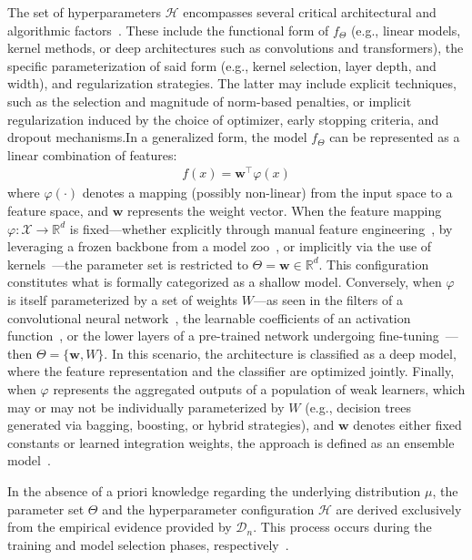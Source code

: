 The set of hyperparameters $\mathcal{H}$ encompasses several critical architectural and algorithmic factors~\citep{shalev2014understanding,goodfellow2016deep,aggarwal2023neural}. These include the functional form of $f_\Theta$ (e.g., linear models, kernel methods, or deep architectures such as convolutions and transformers), the specific parameterization of said form (e.g., kernel selection, layer depth, and width), and regularization strategies. 
The latter may include explicit techniques, such as the selection and magnitude of norm-based penalties, or implicit regularization induced by the choice of optimizer, early stopping criteria, and dropout mechanisms.In a generalized form, the model $f_\Theta$ can be represented as a linear combination of features:\begin{align}\label{ch2:eq:function}f(x) = \mathbf{w}^\top \varphi(x)\end{align}where $\varphi(\cdot)$ denotes a mapping (possibly non-linear) from the input space to a feature space, and $\mathbf{w}$ represents the weight vector.
%
When the feature mapping $\varphi: \mathcal{X} \rightarrow \mathbb{R}^d$ is fixed—whether explicitly through manual feature engineering~\citep{duboue2020art}, by leveraging a frozen backbone from a model zoo~\citep{shu2021zoo}, or implicitly via the use of kernels~\citep{shalev2014understanding}—the parameter set is restricted to $\Theta = \mathbf{w} \in \mathbb{R}^d$. 
This configuration constitutes what is formally categorized as a shallow model.
Conversely, when $\varphi$ is itself parameterized by a set of weights $W$—as seen in the filters of a convolutional neural network~\citep{goodfellow2016deep}, the learnable coefficients of an activation function~\citep{apicella2021survey}, or the lower layers of a pre-trained network undergoing fine-tuning~\citep{shu2021zoo}—then $\Theta = \{ \mathbf{w}, W \}$. 
In this scenario, the architecture is classified as a deep model, where the feature representation and the classifier are optimized jointly.
Finally, when $\varphi$ represents the aggregated outputs of a population of weak learners, which may or may not be individually parameterized by $W$ (e.g., decision trees generated via bagging, boosting, or hybrid strategies), and $\mathbf{w}$ denotes either fixed constants or learned integration weights, the approach is defined as an ensemble model~\citep{sagi2018ensemble}.

In the absence of a priori knowledge regarding the underlying distribution $\mu$, the parameter set $\Theta$ and the hyperparameter configuration $\mathcal{H}$ are derived exclusively from the empirical evidence provided by $\mathcal{D}_n$. 
This process occurs during the training and model selection phases, respectively~\citep{shalev2014understanding,oneto2014fully,OnetoB003}.

